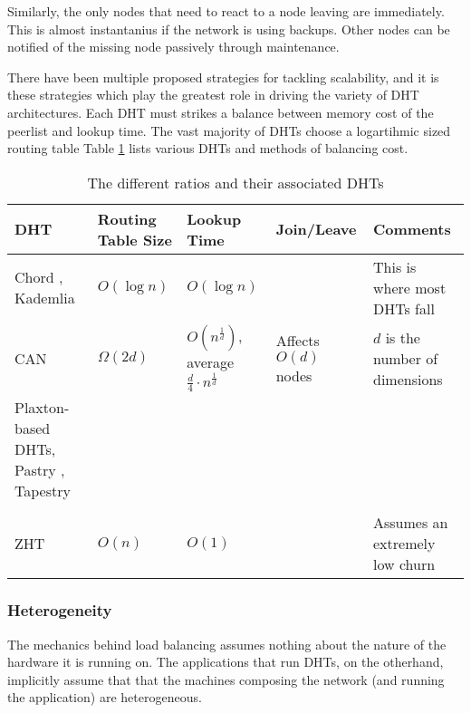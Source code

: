 \documentclass[10pt,letterpaper]{report}
\begin{document}
Similarly, the only nodes that need to react to a node leaving are immediately.
This is almost instantanius if the network is using backups.
Other nodes can be notified of the missing node passively through maintenance.

There have been multiple proposed strategies for tackling scalability, and it is these strategies which play the greatest role in driving the variety of DHT architectures. 
Each DHT must strikes a balance between memory cost of the peerlist and lookup time. 
The vast majority of DHTs choose a logartihmic sized routing table
Table \ref{tab:tradeoffs} lists various DHTs and methods of balancing cost.


\begin{table}[h]
	\small
    \centering
    \begin{tabularx}{\textwidth}{ |X|X|X|X|X| }
    \hline
    DHT & Routing Table Size & Lookup Time & Join/Leave & Comments \\ \hline  
    Chord \cite{chord}, Kademlia \cite{kademlia} & $O(\log n)$ & $O(\log n)$ & & This is where most DHTs fall  \\ \hline
    CAN \cite{can} & $\Omega(2d)$ & $O(n^{\frac{1}{d}})$, average $\frac{d}{4}\cdot n^{\frac{1}{d}}$ & Affects $O(d)$ nodes & $d$ is the number of dimensions \\ \hline
    
    Plaxton-based DHTs, Pastry \cite{pastry}, Tapestry \cite{tapestry} &  & & & \\ \hline
    & & & & \\ \hline  
    ZHT \cite{li2013zht}&   $O(n)$& $O(1)$ &  &Assumes an extremely low churn \\ \hline
    \end{tabularx}
    \caption{The different ratios and their associated DHTs}
    \label{tab:tradeoffs}
\end{table}

\subsubsection{Heterogeneity}
The mechanics behind load balancing assumes nothing about the nature of the hardware it is running on.
The applications that run DHTs, on the otherhand, implicitly assume that that the machines composing the network (and running the application) are heterogeneous.
\end{document}
